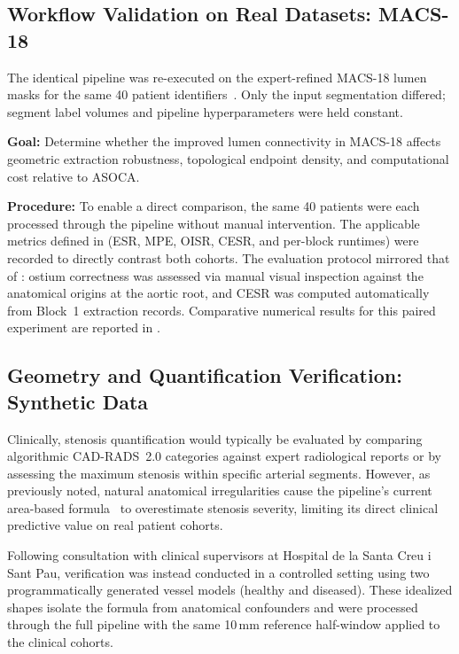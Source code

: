 \subsection{Workflow Validation on Real Datasets: MACS-18}
\label{subsec:validation-macs}

The identical pipeline was re-executed on the expert-refined MACS-18 lumen masks for the same 40 patient identifiers~\cite{acebes2024}. Only the input segmentation differed; segment label volumes and pipeline hyperparameters were held constant.

\textbf{Goal:} Determine whether the improved lumen connectivity in MACS-18 affects geometric extraction robustness, topological endpoint density, and computational cost relative to ASOCA.

\textbf{Procedure:} To enable a direct comparison, the same 40 patients were each processed through the pipeline without manual intervention. The applicable metrics defined in  (ESR, MPE, OISR, CESR, and per-block runtimes) were recorded to directly contrast both cohorts. The evaluation protocol mirrored that of : ostium correctness was assessed via manual visual inspection against the anatomical origins at the aortic root, and CESR was computed automatically from Block~1 extraction records. Comparative numerical results for this paired experiment are reported in .

\subsection{Geometry and Quantification Verification: Synthetic Data}
\label{subsec:validation-synthetic}

Clinically, stenosis quantification would typically be evaluated by comparing algorithmic CAD-RADS~2.0 categories against expert radiological reports or by assessing the maximum stenosis within specific arterial segments. However, as previously noted, natural anatomical irregularities cause the pipeline's current area-based formula~\cite{hideo_kajita2019} to overestimate stenosis severity, limiting its direct clinical predictive value on real patient cohorts.

Following consultation with clinical supervisors at Hospital de la Santa Creu i Sant Pau, verification was instead conducted in a controlled setting using two programmatically generated vessel models (healthy and diseased). These idealized shapes isolate the formula from anatomical confounders and were processed through the full pipeline with the same 10\,mm reference half-window applied to the clinical cohorts.

